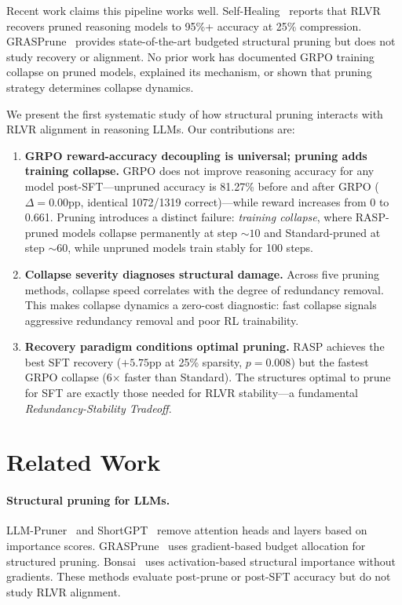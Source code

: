 \documentclass[11pt]{article}
\begin{document}
Recent work claims this pipeline works well.
Self-Healing~\citep{selfhealing2025} reports that RLVR recovers pruned reasoning models to 95\%+ accuracy at 25\% compression.
GRASPrune~\citep{graspune2026} provides state-of-the-art budgeted structural pruning but does not study recovery or alignment.
No prior work has documented GRPO training collapse on pruned models, explained its mechanism, or shown that pruning strategy determines collapse dynamics.

We present the first systematic study of how structural pruning interacts with RLVR alignment in reasoning LLMs.
Our contributions are:

\begin{enumerate}
    \item \textbf{GRPO reward-accuracy decoupling is universal; pruning adds training collapse.}
    GRPO does not improve reasoning accuracy for any model post-SFT---unpruned accuracy is 81.27\% before and after GRPO ($\Delta{=}0.00$pp, identical 1072/1319 correct)---while reward increases from 0 to 0.661. Pruning introduces a distinct failure: \emph{training collapse}, where RASP-pruned models collapse permanently at step ${\sim}10$ and Standard-pruned at step ${\sim}60$, while unpruned models train stably for 100 steps.

    \item \textbf{Collapse severity diagnoses structural damage.}
    Across five pruning methods, collapse speed correlates with the degree of redundancy removal. This makes collapse dynamics a zero-cost diagnostic: fast collapse signals aggressive redundancy removal and poor RL trainability.

    \item \textbf{Recovery paradigm conditions optimal pruning.}
    RASP achieves the best SFT recovery ($+5.75$pp at 25\% sparsity, $p{=}0.008$) but the fastest GRPO collapse (6$\times$ faster than Standard). The structures optimal to prune for SFT are exactly those needed for RLVR stability---a fundamental \emph{Redundancy-Stability Tradeoff}.
\end{enumerate}

\section{Related Work}

\paragraph{Structural pruning for LLMs.}
LLM-Pruner~\citep{llmpruner2023} and ShortGPT~\citep{shortgpt2024} remove attention heads and layers based on importance scores.
GRASPrune~\citep{graspune2026} uses gradient-based budget allocation for structured pruning.
Bonsai~\citep{bonsai2025} uses activation-based structural importance without gradients.
These methods evaluate post-prune or post-SFT accuracy but do not study RLVR alignment.
\end{document}
